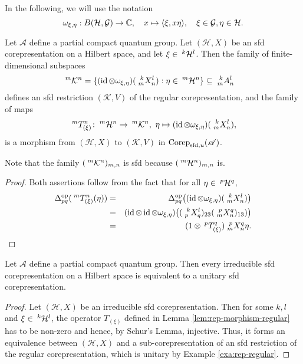 In the following, we will use the notation \[\omega_{\xi,\eta}:B(\Hsp,\mathcal{G})\rightarrow \C,\quad x\mapsto \langle \xi,x\eta\rangle,\quad \xi\in \mathcal{G},\eta\in \Hsp.\]

\begin{Lem} \label{lem:rep-morphism-regular}
  Let $\mathscr{A}$ define a partial compact quantum group. Let $(\mathcal{H},X)$ be an sfd corepresentation on a Hilbert space, and let $\xi \in
  \Gru{\mathcal{H}}{k}{l}$. Then the family of finite-dimensional
  subspaces
  \begin{align*}
   \Gru{\mathcal{K}}{m}{n}  &=  \{ (\id \otimes
   \omega_{\xi,\eta})(\Gr{X}{k}{l}{m}{n}) : \eta \in
   \Gru{\mathcal{H}}{m} {n}\} \subseteq \Gr{A}{k}{l}{m}{n}
  \end{align*}%
  defines an sfd restriction $(\mathcal{K},V)$ of the regular corepresentation, and the family of maps
  \begin{align*}
    \Gru{T_{(\xi)}}{m}{n} \colon \Gru{\mathcal{H}}{m}{n} \to
    \Gru{\mathcal{K}}{m}{n}, \ \eta \mapsto (\id \otimes
    \omega_{\xi,\eta})(\Gr{X}{k}{l}{m}{n}),
  \end{align*}
  is a morphism from $(\mathcal{H},X)$ to $(\mathcal{K},V)$ in $\Corep_{\sfd,u}(\mathscr{A})$. %
\end{Lem}
Note that the family $(\Gru{\mathcal{K}}{m}{n})_{m,n}$ is sfd because $(\Gru{\mathcal{H}}{m}{n})_{m,n}$
is. 
\begin{proof} Both assertions  follow from the fact
  that for all $\eta \in \Gru{\mathcal{H}}{p}{q}$,
\begin{eqnarray*}
\Delta^{\op}_{pq}(\Gru{T_{(\xi)}}{m}{n}(\eta)) &=&  \Delta_{pq}^{\op}\big((\id \otimes
  \omega_{\xi,\eta})(\Gr{X}{k}{l}{m}{n})\big)\\
 &=&(\id \otimes \id \otimes \omega_{\xi,\eta})\big(
  (\Gr{X}{k}{l}{p}{q})_{23}(\Gr{X}{p}{q}{m}{n})_{13})\big) \\ &=&(1
  \otimes \Gru{T_{(\xi)}}{p}{q})\Gr{X}{p}{q}{m}{n} \eta.
\end{eqnarray*}
\end{proof}
\begin{Prop}  \label{prop:rep-unitarisable}
  Let $\mathscr{A}$ define a partial compact quantum group. Then every irreducible sfd corepresentation on a Hilbert space
  is equivalent to a unitary sfd corepresentation.
\end{Prop}
\begin{proof}
  Let $(\mathcal{H},X)$ be an irreducible sfd
  corepresentation. Then for some $k,l$ and $\xi \in
  \Gru{\mathcal{H}}{k}{l}$,  the operator  $T_{(\xi)}$  defined in
  Lemma \ref{lem:rep-morphism-regular} has to be non-zero and hence,
  by Schur's Lemma, injective. Thus, it forms an equivalence between
  $(\mathcal{H},X)$ and a sub-corepresentation of an sfd
  restriction of the regular corepresentation, which is unitary by
  Example \ref{exa:rep-regular}.
\end{proof}

